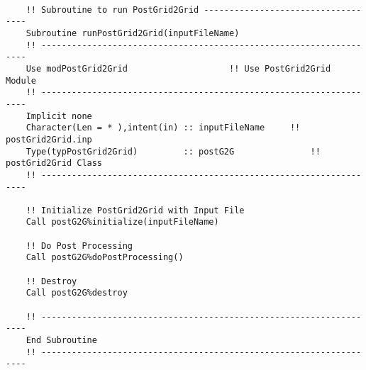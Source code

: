 	\begin{lstlisting}[language={[95]Fortran}]	

	!! Subroutine to run PostGrid2Grid -----------------------------------
	Subroutine runPostGrid2Grid(inputFileName)
	!! -------------------------------------------------------------------
	Use modPostGrid2Grid					!! Use PostGrid2Grid Module
	!! -------------------------------------------------------------------
	Implicit none	
	Character(Len = * ),intent(in) :: inputFileName		!! postGrid2Grid.inp	
	Type(typPostGrid2Grid)         :: postG2G				!! postGrid2Grid Class
	!! -------------------------------------------------------------------	
	
	!! Initialize PostGrid2Grid with Input File	
	Call postG2G%initialize(inputFileName)
	
	!! Do Post Processing
	Call postG2G%doPostProcessing()
	
	!! Destroy
	Call postG2G%destroy
	
	!! -------------------------------------------------------------------
	End Subroutine
	!! -------------------------------------------------------------------	
	\end{lstlisting}